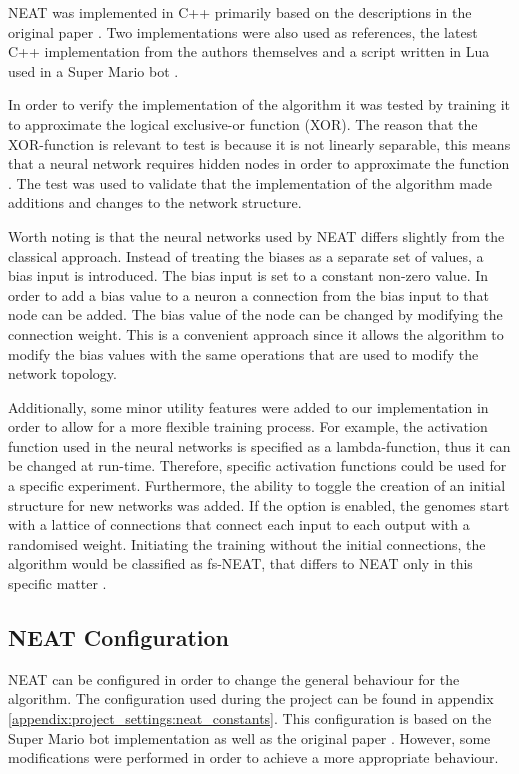 NEAT was implemented in C++ primarily based on the descriptions in the original paper \cite{stanley:neat}. Two implementations were also used as references, the latest C++ implementation from the authors themselves \cite{neat_source} and a script written in Lua used in a Super Mario bot \cite{mario_source}. 

In order to verify the implementation of the algorithm it was tested by training it to approximate the logical exclusive-or function (XOR). The reason that the XOR-function is relevant to test is because it is not linearly separable, this means that a neural network requires hidden nodes in order to approximate the function \cite{haykin, stanley:neat}. The test was used to validate that the implementation of the algorithm made additions and changes to the network structure. 

Worth noting is that the neural networks used by NEAT differs slightly from the classical approach. Instead of treating the biases as a separate set of values, a bias input is introduced. The bias input is set to a constant non-zero value. In order to add a bias value to a neuron a connection from the bias input to that node can be added. The bias value of the node can be changed by modifying the connection weight. This is a convenient approach since it allows the algorithm to modify the bias values with the same operations that are used to modify the network topology.

Additionally, some minor utility features were added to our implementation in order to allow for a more flexible training process. For example, the activation function used in the neural networks is specified as a lambda-function, thus it can be changed at run-time. Therefore, specific activation functions could be used for a specific experiment. Furthermore, the ability to toggle the creation of an initial structure for new networks was added. If the option is enabled, the genomes start with a lattice of connections that connect each input to each output with a randomised weight. Initiating the training without the initial connections, the algorithm would be classified as fs-NEAT, that differs to NEAT only in this specific matter \cite{whiteson}.

\subsection{NEAT Configuration}
NEAT can be configured in order to change the general behaviour for the algorithm. The configuration used during the project can be found in appendix \ref{appendix:project_settings:neat_constants}. This configuration is based on the Super Mario bot implementation \cite{mario_source} as well as the original paper \cite{stanley:neat}. However, some modifications were performed in order to achieve a more appropriate behaviour.

